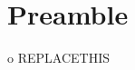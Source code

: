 \documentclass[oneside]{book}
\date{}
\author{Mattia Mascarello}
\begin{document}
	\maketitle
	
	\tableofcontents
\chapter{Preamble}
o
\newpage
REPLACETHIS
\end{document}
